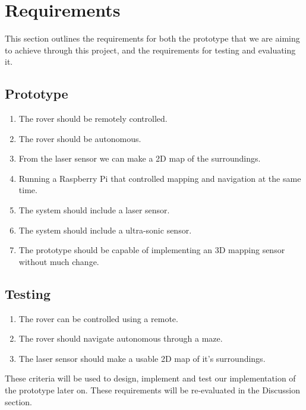 \section{Requirements}

This section outlines the requirements for both the prototype that we are aiming to achieve through this project, and the requirements for testing and evaluating it.

\subsection{Prototype}

\begin{enumerate}
	
	\item The rover should be remotely controlled.
	\item The rover should be autonomous.
	\item From the laser sensor we can make a 2D map of the surroundings.
	\item Running a Raspberry Pi that controlled mapping and navigation at the same time.
	\item The system should include a laser sensor.
	\item The system should include a ultra-sonic sensor.
 	\item The prototype should be capable of implementing an 3D mapping sensor without much change.
	
\end{enumerate}

\subsection{Testing}

\begin{enumerate}
	
	\item The rover can be controlled using a remote.
	\item The rover should navigate autonomous through a maze.
	\item The laser sensor should make a usable 2D map of it's surroundings.
	
\end{enumerate}

These criteria will be used to design, implement and test our implementation of the prototype later on. These requirements will be re-evaluated in the Discussion section.